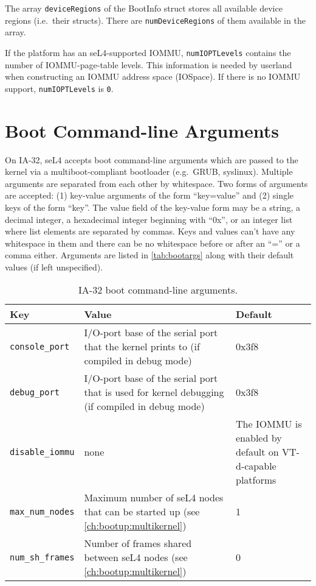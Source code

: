 The array \texttt{deviceRegions} of the BootInfo struct stores all available
device regions (i.e.\ their structs). There are \texttt{numDeviceRegions} of
them available in the array.

If the platform has an seL4-supported IOMMU, \texttt{numIOPTLevels} contains
the number of IOMMU-page-table levels. This information is needed by userland
when constructing an IOMMU address space (IOSpace). If there is no IOMMU
support, \texttt{numIOPTLevels} is \texttt{0}.

\ifxeightsix
\section{Boot Command-line Arguments}

On IA-32, seL4 accepts boot command-line arguments which are passed to the
kernel via a multiboot-compliant bootloader (e.g.\ GRUB, syslinux). Multiple
arguments are separated from each other by whitespace. Two forms of arguments
are accepted:
(1) key-value arguments of the form ``key=value'' and (2) single keys of the
form ``key''. The value field of the key-value form may be a string, a decimal
integer, a hexadecimal integer beginning with ``0x'', or an integer list where
list elements are separated by commas.
Keys and values can't have any whitespace in them and there can be no
whitespace before or after an ``='' or a comma either.
Arguments are listed in \autoref{tab:bootargs} along with their default values (if left unspecified).


\begin{table}[htb]
    \caption{IA-32 boot command-line arguments.}
        \begin{tabularx}{\textwidth}{lXX}
            \toprule
              Key & Value & Default \\
            \midrule
            \texttt{console\_port} &
            I/O-port base of the serial port that the kernel prints to
            (if compiled in debug mode) &
            0x3f8 \\
            \texttt{debug\_port} &
            I/O-port base of the serial port that is used for kernel debugging
            (if compiled in debug mode) &
            0x3f8 \\
            \texttt{disable\_iommu} &
            none &
            The IOMMU is enabled by default on VT-d-capable platforms \\
            \texttt{max\_num\_nodes} &
            Maximum number of seL4 nodes that can be started up (see \autoref{ch:bootup:multikernel}) &
            1 \\
            \texttt{num\_sh\_frames} &
            Number of frames shared between seL4 nodes (see \autoref{ch:bootup:multikernel}) &
            0 \\
            \bottomrule
        \end{tabularx}
    \label{tab:bootargs}
\end{table}
\fi

